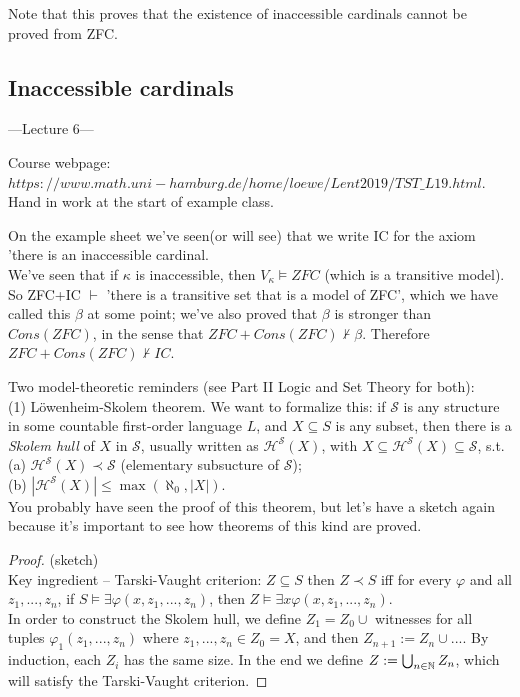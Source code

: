 \documentclass[a4paper]{article}
\begin{document}
Note that this proves that the existence of inaccessible cardinals cannot be proved from ZFC. 

\subsection{Inaccessible cardinals}

---Lecture 6---

Course webpage: \\
$https://www.math.uni-hamburg.de/home/loewe/Lent2019/TST\_L19.html$.\\
Hand in work at the start of example class.

On the example sheet we've seen(or will see) that we write IC for the axiom 'there is an inaccessible cardinal.\\
We've seen that if $\kappa$ is inaccessible, then $V_\kappa \vDash ZFC$ (which is a transitive model). So ZFC+IC $\vdash$ 'there is a transitive set that is a model of ZFC', which we have called this $\beta$ at some point; we've also proved that $\beta$ is stronger than $Cons(ZFC)$, in the sense that $ZFC+Cons(ZFC) \not\vdash \beta$. Therefore $ZFC+Cons(ZFC) \not\vdash IC$.

Two model-theoretic reminders (see Part II Logic and Set Theory for both):\\
(1) L\"{o}wenheim-Skolem theorem. We want to formalize this: if $\mathcal{S}$ is any structure in some countable first-order language $L$, and $X \subseteq S$ is any subset, then there is a \emph{Skolem hull} of $X$ in $\mathcal{S}$, usually written as $\mathcal{H}^\mathcal{S}(X)$, with $X \subseteq \mathcal{H}^\mathcal{S}(X) \subseteq \mathcal{S}$, s.t. \\
(a) $\mathcal{H}^\mathcal{S}(X) \prec \mathcal{S}$ (elementary subsucture of $\mathcal{S}$);\\
(b) $|\mathcal{H}^\mathcal{S}(X)| \leq \max (\aleph_0,|X|)$.\\
You probably have seen the proof of this theorem, but let's have a sketch again because it's important to see how theorems of this kind are proved.
\begin{proof} (sketch)\\
Key ingredient -- Tarski-Vaught criterion: $Z \subseteq S$ then $Z \prec S$ iff for every $\varphi$ and all $z_1,...,z_n$, if $S \vDash \exists \varphi(x,z_1,...,z_n)$, then $Z \vDash \exists x \varphi(x,z_1,...,z_n)$.\\
In order to construct the Skolem hull, we define $Z_1 = Z_0 \cup$ witnesses for all tuples $\varphi_1 (z_1,...,z_n)$ where $z_1,...,z_n \in Z_0 = X$, and then $Z_{n+1}:= Z_n \cup ...$. By induction, each $Z_i$ has the same size. In the end we define $Z := \bigcup_{n \in \mathbb{N}} Z_n$, which will satisfy the Tarski-Vaught criterion.
\end{proof}
\end{document}
